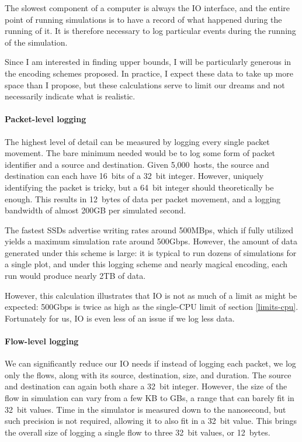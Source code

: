 The slowest component of a computer is always the IO interface, and the entire point of running simulations is to have a record of what happened during the running of it.
It is therefore necessary to log particular events during the running of the simulation.

Since I am interested in finding upper bounds, I will be particularly generous in the encoding schemes proposed.
In practice, I expect these data to take up more space than I propose, but these calculations serve to limit our dreams and not necessarily indicate what is realistic.

\paragraph{Packet-level logging}
The highest level of detail can be measured by logging every single packet movement.
The bare minimum needed would be to log some form of packet identifier and a source and destination.
Given 5,000~hosts, the source and destination can each have 16~bits of a 32~bit integer.
However, uniquely identifying the packet is tricky, but a 64~bit integer should theoretically be enough.
This results in 12~bytes of data per packet movement, and a logging bandwidth of almost 200GB per simulated second.

The fastest SSDs advertise writing rates around 500MBps, which if fully utilized yields a maximum simulation rate around 500Gbps.
However, the amount of data generated under this scheme is large: it is typical to run dozens of simulations for a single plot, and under this logging scheme and nearly magical encoding, each run would produce nearly 2TB of data.

However, this calculation illustrates that IO is not as much of a limit as might be expected: 500Gbps is twice as high as the single-CPU limit of section \ref{limits-cpu}.
Fortunately for us, IO is even less of an issue if we log less data.

\paragraph{Flow-level logging}
We can significantly reduce our IO needs if instead of logging each packet, we log only the flows, along with its source, destination, size, and duration.
The source and destination can again both share a 32~bit integer.
However, the size of the flow in simulation can vary from a few KB to GBs, a range that can barely fit in 32~bit values.
Time in the simulator is measured down to the nanosecond, but such precision is not required, allowing it to also fit in a 32~bit value.
This brings the overall size of logging a single flow to three 32~bit values, or 12~bytes.

